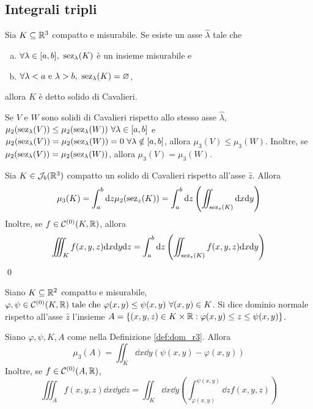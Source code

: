 \subsection{Integrali tripli}

\begin{definition}
    Sia $K \subseteq \mathbb{R}^3$ compatto e misurabile. Se esiste un asse $\hat{\lambda}$ tale che
    \begin{enumerate}[a.]
        \item $\forall \lambda \in [a,b], \ \sez_\lambda(K)$ è un insieme misurabile e
        \item $\forall \lambda < a \text{ e } \lambda > b, \ \operatorname{sez}_\lambda (K) = \varnothing$,
    \end{enumerate}
    allora $K$ è detto solido di Cavalieri.
\end{definition}

\begin{axiom}
    [di Cavalieri]
    Se $V$ e $W$ sono solidi di Cavalieri rispetto allo stesso asse $\hat{\lambda}$, $\mu_2(\sez_\lambda(V))\leq\mu_2(\sez_\lambda(W)) \ \forall \lambda \in [a,b]$ e $\mu_2(\sez_\lambda(V))=\mu_2(\sez_\lambda(W))=0 \ \forall \lambda \notin [a,b]$, allora $\mu_3(V)\leq \mu_3(W)$. Inoltre, se $\mu_2(\operatorname{sez}_\lambda(V))=\mu_2(\operatorname{sez}_\lambda(W))$, allora $\mu_3(V)=\mu_3(W)$.
\end{axiom}

\begin{theorem}
    [di Cavalieri]
    Sia $K \in \mathcal{J}_b(\mathbb{R}^3)$ compatto un solido di Cavalieri rispetto all'asse $\hat{z}$. Allora
    $$
        \mu_3(K)=\int_a^b\dd z\mu_2(\operatorname{sez}_z(K))=\int_a^b\dd z\left(\iint_{\operatorname{sez}_z(K)}\dd x\dd y\right)    
    $$
    Inoltre, se $f \in \mathcal{C}^{(0)}(K,\mathbb{R})$, allora
    $$
        \iiint_Kf(x,y,z)\dd x\dd y\dd z=\int_a^b\dd z\left(\iint_{\operatorname{sez}_z(K)}f(x,y,z)\dd x\dd y\right)
    $$
    \qed
\end{theorem}

\begin{definition}
    \label{def:dom_r3}
    Siano $K\subseteq \mathbb{R}^2$ compatto e misurabile, $\varphi,\psi \in \mathcal{C}^{(0)}(K,\mathbb{R}) \text{ tale che } \varphi(x,y)\leq \psi(x,y) \ \forall (x,y) \in K$. Si dice dominio normale rispetto all'asse $\hat{z}$ l'insieme $A=\{(x,y,z)\in K \times \mathbb{R} : \varphi(x,y)\leq z \leq \psi(x,y)\}$.
\end{definition}

\begin{theorem}
    Siano $\varphi, \psi, K, A$ come nella Definizione \ref{def:dom_r3}. Allora
    $$
        \mu_3(A)=\iint_K\dd x\dd y(\psi(x,y)-\varphi(x,y))
    $$
    Inoltre, se $f \in \mathcal{C}^{(0)}(A,\mathbb{R})$,
    $$
        \iiint_Af(x,y,z)\dd x\dd y\dd z = \iint_K\dd x\dd y\left(\int_{\varphi(x,y)}^{\psi(x,y)}\dd zf(x,y,z)\right)
    $$
\end{theorem}

